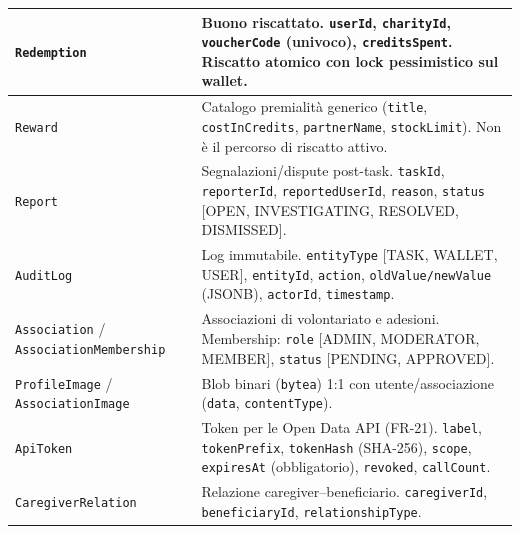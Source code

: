 \documentclass[11pt,a4paper]{article}
\begin{document}
\begin{xltabular}{\linewidth}{|L{4.0cm}|Y|}
\texttt{Redemption} & Buono riscattato. \texttt{userId}, \texttt{charityId}, \texttt{voucherCode} (univoco), \texttt{creditsSpent}. Riscatto atomico con lock pessimistico sul wallet.\\\hline
\texttt{Reward} & Catalogo premialit\`a generico (\texttt{title}, \texttt{costInCredits}, \texttt{partnerName}, \texttt{stockLimit}). Non \`e il percorso di riscatto attivo.\\\hline
\texttt{Report} & Segnalazioni/dispute post-task. \texttt{taskId}, \texttt{reporterId}, \texttt{reportedUserId}, \texttt{reason}, \texttt{status} [OPEN, INVESTIGATING, RESOLVED, DISMISSED].\\\hline
\texttt{AuditLog} & Log immutabile. \texttt{entityType} [TASK, WALLET, USER], \texttt{entityId}, \texttt{action}, \texttt{oldValue/newValue} (JSONB), \texttt{actorId}, \texttt{timestamp}.\\\hline
\texttt{Association} / \texttt{AssociationMembership} & Associazioni di volontariato e adesioni. Membership: \texttt{role} [ADMIN, MODERATOR, MEMBER], \texttt{status} [PENDING, APPROVED].\\\hline
\texttt{ProfileImage} / \texttt{AssociationImage} & Blob binari (\texttt{bytea}) 1:1 con utente/associazione (\texttt{data}, \texttt{contentType}).\\\hline
\texttt{ApiToken} & Token per le Open Data API (FR-21). \texttt{label}, \texttt{tokenPrefix}, \texttt{tokenHash} (SHA-256), \texttt{scope}, \texttt{expiresAt} (obbligatorio), \texttt{revoked}, \texttt{callCount}.\\\hline
\texttt{CaregiverRelation} & Relazione caregiver--beneficiario. \texttt{caregiverId}, \texttt{beneficiaryId}, \texttt{relationshipType}.\\\hline
\end{xltabular}
\end{document}
